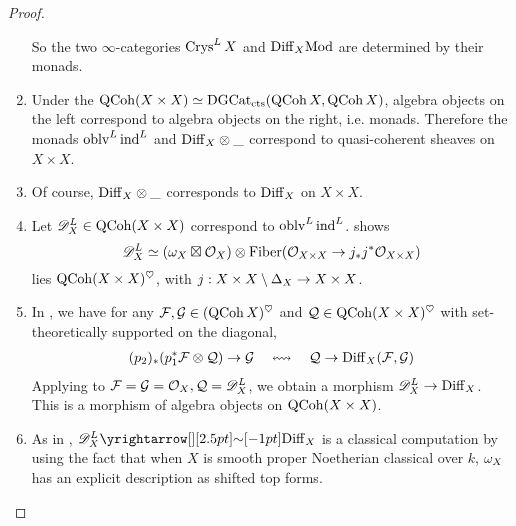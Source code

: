 \documentclass[./main.tex]{subfiles}
\begin{document}
\begin{proof}
\begin{enumerate}
    So the two $\infty$-categories $\mathrm{Crys}^L\,X$ and 
    $\mathrm{Diff}_X\mathrm{Mod}$ are determined by their monads.

    \item Under the 
    $\mathrm{QCoh} (X\times X) \simeq \mathrm{DGCat}_{\mathrm{cts}}(\mathrm{QCoh}\,X , \mathrm{QCoh}\,X)$,
    algebra objects on the left correspond to 
    algebra objects on the right, i.e. monads.
    Therefore the monads $\mathrm{oblv}^L\,\mathrm{ind}^L$ and $\mathrm{Diff}_X \otimes \_$
    correspond to quasi-coherent sheaves on $X \times X$.

    \item Of course, $\mathrm{Diff}_X \otimes \_$ corresponds to 
    $\mathrm{Diff}_X$ on $X \times X$.

    \item
    Let $\mathscr{D}^L_X \in \mathrm{QCoh}(X\times X)$ correspond to $\mathrm{oblv}^L\,\mathrm{ind}^L$.
    \cite[Prop 5.3.6]{Crys} shows 
    \[ 
      \mathscr{D}^L_X \simeq (\omega_X \boxtimes \mathcal{O}_X) \otimes 
      \mathrm{Fiber}(\mathcal{O}_{X\times X} \to j_* j^* \mathcal{O}_{X\times X})
    \]
    lies $\mathrm{QCoh}(X\times X)^\heartsuit$,
    with $j : X \times X \setminus \Delta_X \to X \times X$.

    \item
    In \cite[Section 5.4.1]{Crys}, we have
    for any $\mathcal{F}, \mathcal{G} \in (\mathrm{QCoh}\,X)^\heartsuit$ and 
    $\mathcal{Q} \in \mathrm{QCoh}(X \times X)^\heartsuit$ 
    with set-theoretically supported on the diagonal,
    \begin{align*}
      (p_2)_* (p_1^* \mathcal{F} \otimes \mathcal{Q}) \to \mathcal{G} \,\,\,\,\,\,
      \leftrightsquigarrow \,\,\,\,\,\, \mathcal{Q} \to \mathrm{Diff}_X(\mathcal{F} , \mathcal{G})
    \end{align*}
    Applying to $\mathcal{F} = \mathcal{G} = \mathcal{O}_X, \mathcal{Q} = \mathscr{D}^L_X$,
    we obtain a morphism $\mathscr{D}^L_X \to \mathrm{Diff}_X$.
    This is a morphism of algebra objects on $\mathrm{QCoh}(X\times X)$.

    \item 
    As in \cite[Section 5.4.3]{Crys}, 
    $\s{D}^L_X \map{\sim}{} \DIFF_X$ 
    is a classical computation by using the fact that
    when $X$ is smooth proper Noetherian classical over $k$,
    $\omega_X$ has an explicit description as shifted top forms.
    \cite[Lem 48.15.7]{stacks}


\end{enumerate}
\end{proof}
\end{document}
